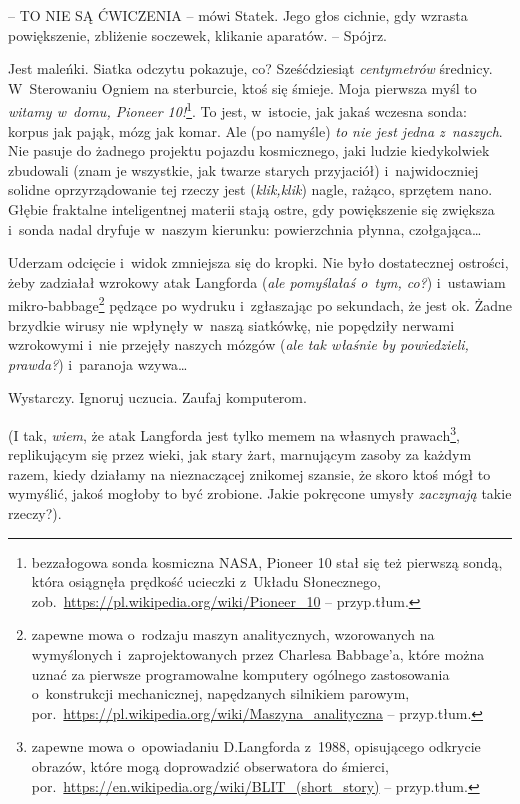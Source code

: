 \documentclass[oneside,polish,11pt,sfheadings]{mwbk}
\begin{document}
-- TO NIE SĄ ĆWICZENIA -- mówi Statek. Jego głos cichnie, gdy wzrasta
powiększenie, zbliżenie soczewek, klikanie aparatów. -- Spójrz.

Jest maleńki. Siatka odczytu pokazuje, co? Sześćdziesiąt
\textit{centymetrów} średnicy. W~Sterowaniu Ogniem na sterburcie, ktoś się
śmieje. Moja pierwsza myśl to \textit{witamy w~domu, Pioneer 10!}\footnote{
bezzałogowa sonda kosmiczna NASA, Pioneer 10 stał się też pierwszą
sondą, która osiągnęła prędkość ucieczki z~Układu Słonecznego,
zob.~\url{https://pl.wikipedia.org/wiki/Pioneer\_10} -- przyp.tłum.}. To jest, w~istocie, jak jakaś wczesna sonda: korpus jak
pająk, mózg jak komar. Ale (po namyśle) \textit{to nie jest jedna z~naszych}. Nie pasuje do żadnego projektu pojazdu kosmicznego, jaki
ludzie kiedykolwiek zbudowali (znam je wszystkie, jak twarze starych
przyjaciół) i~najwidoczniej solidne oprzyrządowanie tej rzeczy jest
(\textit{klik,klik}) nagle, rażąco, sprzętem nano. Głębie fraktalne
inteligentnej materii stają ostre, gdy powiększenie się zwiększa i~sonda
nadal dryfuje w~naszym kierunku: powierzchnia płynna, czołgająca\ldots 

Uderzam odcięcie i~widok zmniejsza się do kropki. Nie było dostatecznej
ostrości, żeby zadziałał wzrokowy atak Langforda (\textit{ale pomyślałaś o~tym, co?}) i~ustawiam mikro-babbage\footnote{ zapewne mowa o~rodzaju maszyn
analitycznych, wzorowanych na wymyślonych i~zaprojektowanych przez
Charlesa Babbage'a, które można uznać za pierwsze
programowalne komputery ogólnego zastosowania o~konstrukcji
mechanicznej, napędzanych silnikiem parowym,
por.~\url{https://pl.wikipedia.org/wiki/Maszyna\_analityczna}
-- przyp.tłum.} pędzące po wydruku i~zgłaszając po sekundach, że jest
ok. Żadne brzydkie wirusy nie wpłynęły w~naszą siatkówkę, nie popędziły
nerwami wzrokowymi i~nie przejęły naszych mózgów (\textit{ale tak właśnie
by powiedzieli, prawda?}) i~paranoja wzywa\ldots 

Wystarczy. Ignoruj uczucia. Zaufaj komputerom.

(I tak, \textit{wiem}, że atak Langforda jest tylko memem na własnych
prawach\footnote{ zapewne mowa o~opowiadaniu D.Langforda z~1988, opisującego odkrycie
obrazów, które mogą doprowadzić obserwatora do śmierci,
por.~\url{https://en.wikipedia.org/wiki/BLIT\_(short\_story)}
-- przyp.tłum.}, replikującym się przez wieki, jak stary żart,
marnującym zasoby za każdym razem, kiedy działamy na nieznaczącej
znikomej szansie, że skoro ktoś mógł to wymyślić, jakoś mogłoby to być
zrobione. Jakie pokręcone umysły \textit{zaczynają} takie rzeczy?).
\end{document}
